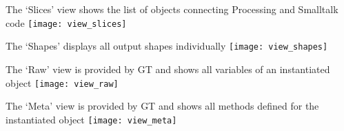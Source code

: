 \begin{cfigure}{The `Slices' view shows the list of objects connecting Processing and Smalltalk code}
\texttt{[image: view\_slices]}
\end{cfigure}

\begin{cfigure}{The `Shapes' displays all output shapes individually}
\texttt{[image: view\_shapes]}
\end{cfigure}

\begin{cfigure}{The `Raw' view is provided by \ac{GT} and shows all variables of an instantiated object}
\texttt{[image: view\_raw]}
\end{cfigure}

\begin{cfigure}{The `Meta' view is provided by \ac{GT} and shows all methods defined for the instantiated object}
\texttt{[image: view\_meta]}
\end{cfigure}

